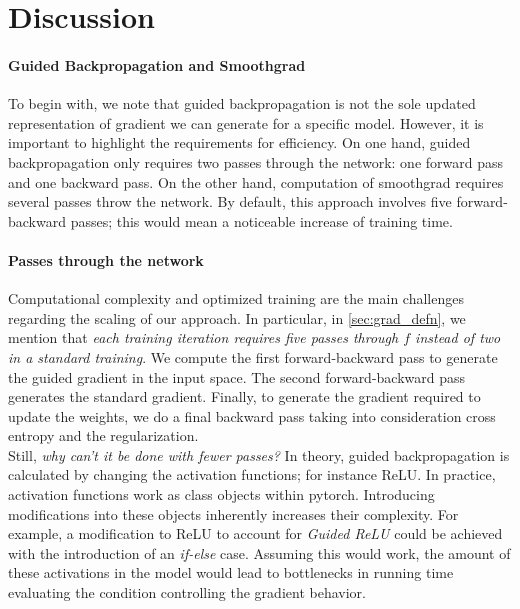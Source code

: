 \section{Discussion}
\label{sec:grad_discussion}
\paragraph{Guided Backpropagation and Smoothgrad} To begin with, we note that guided 
backpropagation is not the sole updated representation of gradient we can generate for a specific 
model. However, it is important to highlight the requirements for efficiency. On one hand, guided 
backpropagation only requires two passes through the network: one forward pass and one backward 
pass. On the other hand, computation of smoothgrad requires several passes throw the network. By 
default, this approach involves five forward-backward passes; this would mean a noticeable 
increase of training time.

\paragraph{Passes through the network} Computational complexity and optimized 
training are the main challenges regarding the scaling of our approach. In particular, 
in \autoref{sec:grad_defn}, we mention that \emph{each training iteration requires five passes 
through $f$ instead of two in a standard training}. We compute the first forward-backward pass 
to generate the guided gradient in the input space. The second forward-backward pass generates the 
standard gradient. Finally, to generate the gradient required to update the weights, we do a final 
backward pass taking into consideration cross entropy and the regularization.\\

\noindent Still, \emph{why can't it be done with fewer passes?} In theory, 
guided backpropagation is calculated by changing the activation functions; for instance ReLU. 
In practice, activation functions work as class objects within pytorch. Introducing 
modifications into these objects inherently increases their complexity. For example, a modification 
to ReLU to account for \emph{Guided ReLU} could be achieved with the introduction of an \emph{if-else} 
case. Assuming this would work, the amount of these activations in the model would lead to 
bottlenecks in running time evaluating the condition controlling the gradient behavior. 

